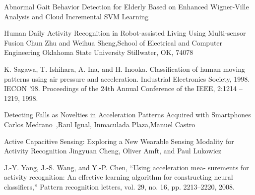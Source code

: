 \documentclass[a4paper, parskip=full]{scrartcl}
\begin{document}
\begin{thebibliography}{9}
 Abnormal Gait Behavior Detection for Elderly Based on Enhanced Wigner-Ville Analysis and Cloud Incremental SVM Learning
 

Human Daily Activity Recognition in Robot-assisted Living Using Multi-sensor Fusion
Chun Zhu and Weihua Sheng,School of Electrical and Computer Engineering
Oklahoma State University Stillwater, OK, 74078


K. Sagawa, T. Ishihara, A. Ina, and H. Inooka. Classification of human moving patterns using air pressure and acceleration. Industrial Electronics Society, 1998. IECON ’98. Proceedings of the 24th Annual Conference of the IEEE, 2:1214 – 1219, 1998.

Detecting Falls as Novelties in Acceleration Patterns Acquired with Smartphones
Carlos Medrano ,Raul Igual, Inmaculada Plaza,Manuel Castro

Active Capacitive Sensing: Exploring a New Wearable Sensing Modality for Activity Recognition Jingyuan Cheng, Oliver Amft, and Paul Lukowicz

J.-Y. Yang, J.-S. Wang, and Y.-P. Chen, “Using acceleration mea-
surements for activity recognition: An effective learning algorithm for
constructing neural classifiers,” Pattern recognition letters, vol. 29,
no. 16, pp. 2213–2220, 2008.	
	
\end{thebibliography}
 
\end{document}
